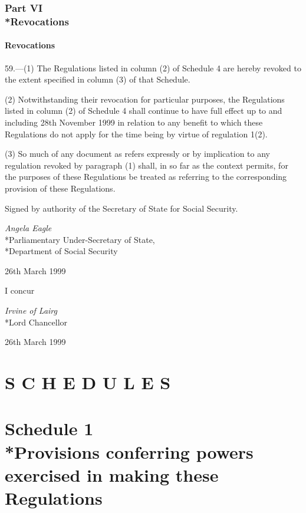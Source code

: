 \documentclass[12pt,a4paper]{article}
\begin{document}
\section[Part VI --- Revocations]{Part VI\\*Revocations}

\subsection[59. Revocations]{Revocations}

\renewcommand\parthead{--- Part VI}

59.—(1) The Regulations listed in column (2) of Schedule 4 are hereby revoked to the extent specified in column (3) of that Schedule.

(2) Notwithstanding their revocation for particular purposes, the Regulations listed in column (2) of Schedule 4 shall continue to have full effect up to and including 28th November 1999 in relation to any benefit to which these Regulations do not apply for the time being by virtue of regulation 1(2).

(3) So much of any document as refers expressly or by implication to any regulation revoked by paragraph (1) shall, in so far as the context permits, for the purposes of these Regulations be treated as referring to the corresponding provision of these Regulations.

\bigskip

Signed 
by authority of the Secretary of State for Social Security.

{\raggedleft
\emph{Angela Eagle}\\*Parliamentary Under-Secretary of State,\\*Department of Social Security

}

26th March 1999

\bigskip

I concur

{\raggedleft
\emph{Irvine of Lairg}\\*Lord Chancellor

}

26th March 1999

\small

\part*{S C H E D U L E S}

\part[Schedule 1 --- Provisions conferring powers exercised in making these Regulations]{Schedule 1\\*Provisions conferring powers exercised in making these Regulations}
\end{document}
